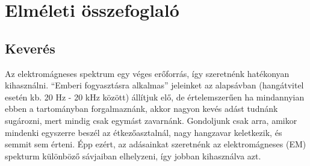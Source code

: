 \documentclass[12pt,a4paper]{article}
\begin{document}
\section{Elméleti összefoglaló}
\subsection{Keverés}
Az elektromágneses spektrum egy véges erőforrás, így szeretnénk hatékonyan kihasználni.
``Emberi fogyasztásra alkalmas'' jeleinket az alapsávban (hangátvitel esetén kb. 20 Hz - 20 kHz között) állítjuk elő, de értelemszerűen ha mindannyian ebben a tartományban forgalmaznánk, akkor nagyon kevés adást tudnánk sugározni, mert mindig csak egymást zavarnánk. Gondoljunk csak arra, amikor mindenki egyszerre beszél az étkezőasztalnál, nagy hangzavar keletkezik, és semmit sem érteni. Épp ezért, az adásainkat szeretnénk az elektromágneses (EM) spekturm különböző sávjaiban elhelyzeni, így jobban kihasználva azt.
\end{document}
